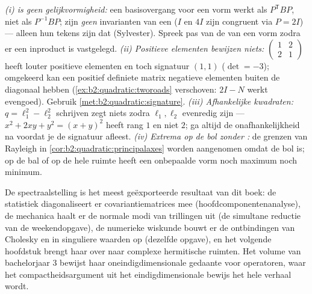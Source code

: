 \begin{remark}
\emph{(i)  is geen gelijkvormigheid:} een basisovergang
voor een vorm werkt als $P^{\mathsf T}BP$, niet als $P^{-1}BP$;
 zijn \emph{geen} invarianten van een 
($I$ en $4I$ zijn congruent via $P = 2I$) --- alleen hun tekens
zijn dat (Sylvester). Spreek pas van de  van een vorm
zodra er een inproduct is vastgelegd. \emph{(ii) Positieve
elementen bewijzen niets:} $\begin{pmatrix} 1 & 2\\ 2 &
1\end{pmatrix}$ heeft louter positieve elementen en toch signatuur
$(1,1)$ ($\det = -3$); omgekeerd kan een positief definiete matrix
negatieve elementen buiten de diagonaal hebben
(\cref{ex:b2:quadratic:tworoads} verschoven: $2I - N$ werkt
evengoed). Gebruik \cref{met:b2:quadratic:signature}.
\emph{(iii) Afhankelijke kwadraten:} $q = \ell_1^2 - \ell_2^2$
schrijven zegt niets zodra $\ell_1, \ell_2$ evenredig zijn --- $x^2
+ 2xy + y^2 = (x+y)^2$ heeft rang $1$ en niet $2$; ga altijd de
onafhankelijkheid na voordat je de signatuur afleest. \emph{(iv)
Extrema op de bol zonder :} de grenzen van Rayleigh in
\cref{cor:b2:quadratic:principalaxes} worden aangenomen omdat de
bol  is; op de  bal of op de hele ruimte heeft een
onbepaalde vorm noch maximum noch minimum.
\end{remark}

\begin{remark}
De spectraalstelling is het meest geëxporteerde resultaat van dit
boek: de statistiek diagonaliseert er covariantiematrices mee
(hoofdcomponentenanalyse), de mechanica haalt er de normale modi
van trillingen uit (de simultane reductie van de weekendopgave), de
numerieke wiskunde bouwt er de ontbindingen van Cholesky en in
singuliere waarden op (dezelfde opgave), en het volgende hoofdstuk
brengt haar over naar complexe hermitische ruimten. Het volume van
bachelorjaar 3 bewijst haar oneindigdimensionale gedaante voor
  operatoren, waar het compactheidsargument
uit het eindigdimensionale bewijs het hele verhaal wordt.
\end{remark}


